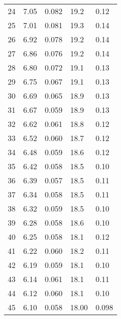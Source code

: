 \begin{table}
\begin{tabular}{c|ll|ll}
24 & 7.05 & 0.082 & 19.2 & 0.12 \\
25 & 7.01 & 0.081 & 19.3 & 0.14 \\
26 & 6.92 & 0.078 & 19.2 & 0.14 \\
27 & 6.86 & 0.076 & 19.2 & 0.14 \\
28 & 6.80 & 0.072 & 19.1 & 0.13 \\
29 & 6.75 & 0.067 & 19.1 & 0.13 \\
30 & 6.69 & 0.065 & 18.9 & 0.13 \\
31 & 6.67 & 0.059 & 18.9 & 0.13 \\
32 & 6.62 & 0.061 & 18.8 & 0.12 \\
33 & 6.52 & 0.060 & 18.7 & 0.12 \\
34 & 6.48 & 0.059 & 18.6 & 0.12 \\
35 & 6.42 & 0.058 & 18.5 & 0.10 \\
36 & 6.39 & 0.057 & 18.5 & 0.11 \\
37 & 6.34 & 0.058 & 18.5 & 0.11 \\
38 & 6.32 & 0.059 & 18.5 & 0.10 \\
39 & 6.28 & 0.058 & 18.6 & 0.10 \\
40 & 6.25 & 0.058 & 18.1 & 0.12 \\
41 & 6.22 & 0.060 & 18.2 & 0.11 \\
42 & 6.19 & 0.059 & 18.1 & 0.10 \\
43 & 6.14 & 0.061 & 18.1 & 0.11 \\
44 & 6.12 & 0.060 & 18.1 & 0.10 \\
45 & 6.10 & 0.058 & 18.00 & 0.098 \\
               \hline
        \end{tabular}
    \end{table}
    \clearpage

